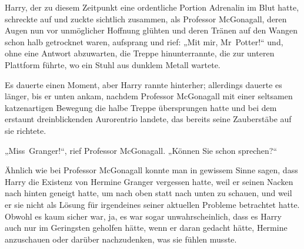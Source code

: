 Harry, der zu diesem Zeitpunkt eine ordentliche Portion Adrenalin im Blut hatte, schreckte auf und zuckte sichtlich zusammen, als Professor McGonagall, deren Augen nun vor unmöglicher Hoffnung glühten und deren Tränen auf den Wangen schon halb getrocknet waren, aufsprang und rief: „Mit mir, Mr~Potter!“ und, ohne eine Antwort abzuwarten, die Treppe hinunterrannte, die zur unteren Plattform führte, wo ein Stuhl aus dunklem Metall wartete.

Es dauerte einen Moment, aber Harry rannte hinterher; allerdings dauerte es länger, bis er unten ankam, nachdem Professor McGonagall mit einer seltsamen katzenartigen Bewegung die halbe Treppe übersprungen hatte und bei dem erstaunt dreinblickenden Aurorentrio landete, das bereits seine Zauberstäbe auf sie richtete.

„Miss~Granger!“, rief Professor McGonagall. „Können Sie schon sprechen?“

Ähnlich wie bei Professor McGonagall konnte man in gewissem Sinne sagen, dass Harry die Existenz von Hermine Granger vergessen hatte, weil er seinen Nacken nach hinten geneigt hatte, um nach oben statt nach unten zu schauen, und weil er sie nicht als Lösung für irgendeines seiner aktuellen Probleme betrachtet hatte. Obwohl es kaum sicher war, ja, es war sogar unwahrscheinlich, dass es Harry auch nur im Geringsten geholfen hätte, wenn er daran gedacht hätte, Hermine anzuschauen oder darüber nachzudenken, was sie fühlen musste.


